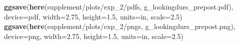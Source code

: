 \documentclass[
  doc,floatsintext]{apa6}
\newenvironment{Shaded}{\begin{snugshade}}{\end{snugshade}}
\newcommand{\AttributeTok}[1]{\textcolor[rgb]{0.13,0.29,0.53}{#1}}
\newcommand{\FloatTok}[1]{\textcolor[rgb]{0.00,0.00,0.81}{#1}}
\newcommand{\FunctionTok}[1]{\textcolor[rgb]{0.13,0.29,0.53}{\textbf{#1}}}
\newcommand{\NormalTok}[1]{#1}
\newcommand{\StringTok}[1]{\textcolor[rgb]{0.31,0.60,0.02}{#1}}
\begin{document}
\begin{Shaded}
\begin{Highlighting}[]
\FunctionTok{ggsave}\NormalTok{(}\FunctionTok{here}\NormalTok{(}\StringTok{\textquotesingle{}supplement/plots/exp\_2/pdfs\textquotesingle{}}\NormalTok{, }\StringTok{\textquotesingle{}g\_lookingdurs\_prepost.pdf\textquotesingle{}}\NormalTok{), }
       \AttributeTok{device=}\StringTok{\textquotesingle{}pdf\textquotesingle{}}\NormalTok{, }\AttributeTok{width=}\FloatTok{2.75}\NormalTok{, }\AttributeTok{height=}\FloatTok{1.5}\NormalTok{, }\AttributeTok{units=}\StringTok{\textquotesingle{}in\textquotesingle{}}\NormalTok{, }\AttributeTok{scale=}\FloatTok{2.5}\NormalTok{)}
\FunctionTok{ggsave}\NormalTok{(}\FunctionTok{here}\NormalTok{(}\StringTok{\textquotesingle{}supplement/plots/exp\_2/pngs\textquotesingle{}}\NormalTok{, }\StringTok{\textquotesingle{}g\_lookingdurs\_prepost.png\textquotesingle{}}\NormalTok{), }
       \AttributeTok{device=}\StringTok{\textquotesingle{}png\textquotesingle{}}\NormalTok{, }\AttributeTok{width=}\FloatTok{2.75}\NormalTok{, }\AttributeTok{height=}\FloatTok{1.5}\NormalTok{, }\AttributeTok{units=}\StringTok{\textquotesingle{}in\textquotesingle{}}\NormalTok{, }\AttributeTok{scale=}\FloatTok{2.5}\NormalTok{)}
\end{Highlighting}
\end{Shaded}
\end{document}
